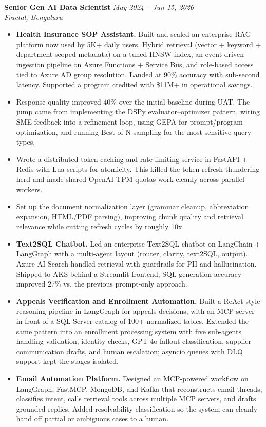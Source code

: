 \documentclass[a4paper,10pt]{article}
\newcommand{\roleheader}[4]{
    \needspace{5\baselineskip}%
    \textbf{#1} \hfill \textit{#4} \\
    \textit{#2, #3}%
    \nopagebreak
}
\begin{document}
\roleheader{Senior Gen AI Data Scientist}{Fractal}{Bengaluru}{May 2024 -- Jun 15, 2026}
\begin{itemize}[leftmargin=*, itemsep=3pt, topsep=4pt]
    \item \textbf{Health Insurance SOP Assistant.} Built and scaled an enterprise RAG platform now used by 5K+ daily users. Hybrid retrieval (vector + keyword + department-scoped metadata) on a tuned HNSW index, an event-driven ingestion pipeline on Azure Functions + Service Bus, and role-based access tied to Azure AD group resolution. Landed at 90\% accuracy with sub-second latency. Supported a program credited with \$11M+ in operational savings.
    \item Response quality improved 40\% over the initial baseline during UAT. The jump came from implementing the DSPy evaluator--optimizer pattern, wiring SME feedback into a refinement loop, using GEPA for prompt/program optimization, and running Best-of-N sampling for the most sensitive query types.
    \item Wrote a distributed token caching and rate-limiting service in FastAPI + Redis with Lua scripts for atomicity. This killed the token-refresh thundering herd and made shared OpenAI TPM quotas work cleanly across parallel workers.
    \item Set up the document normalization layer (grammar cleanup, abbreviation expansion, HTML/PDF parsing), improving chunk quality and retrieval relevance while cutting refresh cycles by roughly 10x.
    \item \textbf{Text2SQL Chatbot.} Led an enterprise Text2SQL chatbot on LangChain + LangGraph with a multi-agent layout (router, clarity, text2SQL, output). Azure AI Search handled retrieval with guardrails for PII and hallucination. Shipped to AKS behind a Streamlit frontend; SQL generation accuracy improved 27\% vs. the previous prompt-only approach.
    \item \textbf{Appeals Verification and Enrollment Automation.} Built a ReAct-style reasoning pipeline in LangGraph for appeals decisions, with an MCP server in front of a SQL Server catalog of 100+ normalized tables. Extended the same pattern into an enrollment processing system with five sub-agents handling validation, identity checks, GPT-4o fallout classification, supplier communication drafts, and human escalation; asyncio queues with DLQ support kept the stages isolated.
    \item \textbf{Email Automation Platform.} Designed an MCP-powered workflow on LangGraph, FastMCP, MongoDB, and Kafka that reconstructs email threads, classifies intent, calls retrieval tools across multiple MCP servers, and drafts grounded replies. Added resolvability classification so the system can cleanly hand off partial or ambiguous cases to a human.
\end{itemize}
\end{document}
